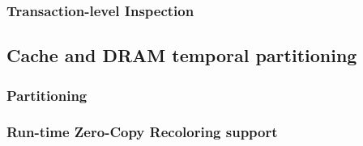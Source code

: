\subsubsection{Transaction-level Inspection}


\subsection{Cache and DRAM temporal partitioning}

\subsubsection{Partitioning}
        \subsubsection{Run-time Zero-Copy Recoloring support}

